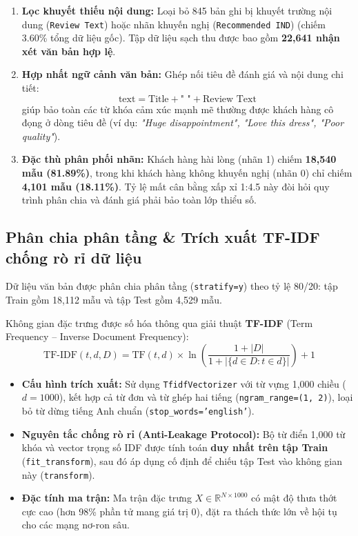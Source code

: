 \documentclass[12pt,a4paper]{report}
\begin{document}
\begin{enumerate}
    \item \textbf{Lọc khuyết thiếu nội dung:} Loại bỏ 845 bản ghi bị khuyết trường nội dung (\texttt{Review Text}) hoặc nhãn khuyến nghị (\texttt{Recommended IND}) (chiếm 3.60\% tổng dữ liệu gốc). Tập dữ liệu sạch thu được bao gồm \textbf{22,641 nhận xét văn bản hợp lệ}.
    \item \textbf{Hợp nhất ngữ cảnh văn bản:} Ghép nối tiêu đề đánh giá và nội dung chi tiết:
    \begin{equation}
        \text{text} = \text{Title} + \text{" "} + \text{Review Text}
    \end{equation}
    giúp bảo toàn các từ khóa cảm xúc mạnh mẽ thường được khách hàng cô đọng ở dòng tiêu đề (ví dụ: \textit{"Huge disappointment", "Love this dress", "Poor quality"}).
    \item \textbf{Đặc thù phân phối nhãn:} Khách hàng hài lòng (nhãn 1) chiếm \textbf{18,540 mẫu (81.89\%)}, trong khi khách hàng không khuyến nghị (nhãn 0) chỉ chiếm \textbf{4,101 mẫu (18.11\%)}. Tỷ lệ mất cân bằng xấp xỉ 1:4.5 này đòi hỏi quy trình phân chia và đánh giá phải bảo toàn lớp thiểu số.
\end{enumerate}

\subsection{Phân chia phân tầng \& Trích xuất TF-IDF chống rò rỉ dữ liệu}
Dữ liệu văn bản được phân chia phân tầng (\texttt{stratify=y}) theo tỷ lệ 80/20: tập Train gồm 18,112 mẫu và tập Test gồm 4,529 mẫu. 

Không gian đặc trưng được số hóa thông qua giải thuật \textbf{TF-IDF} (Term Frequency -- Inverse Document Frequency):
\begin{equation}
    \text{TF-IDF}(t, d, D) = \text{TF}(t, d) \times \ln\left( \frac{1 + |D|}{1 + |\{d \in D : t \in d\}|} \right) + 1
\end{equation}
\begin{itemize}
    \item \textbf{Cấu hình trích xuất:} Sử dụng \texttt{TfidfVectorizer} với từ vựng 1,000 chiều ($d = 1000$), kết hợp cả từ đơn và từ ghép hai tiếng (\texttt{ngram\_range=(1, 2)}), loại bỏ từ dừng tiếng Anh chuẩn (\texttt{stop\_words='english'}).
    \item \textbf{Nguyên tắc chống rò rỉ (Anti-Leakage Protocol):} Bộ từ điển 1,000 từ khóa và vector trọng số IDF được tính toán \textbf{duy nhất trên tập Train} (\texttt{fit\_transform}), sau đó áp dụng cố định để chiếu tập Test vào không gian này (\texttt{transform}).
    \item \textbf{Đặc tính ma trận:} Ma trận đặc trưng $X \in \mathbb{R}^{N \times 1000}$ có mật độ thưa thớt cực cao (hơn 98\% phần tử mang giá trị 0), đặt ra thách thức lớn về hội tụ cho các mạng nơ-ron sâu.
\end{itemize}
\end{document}
